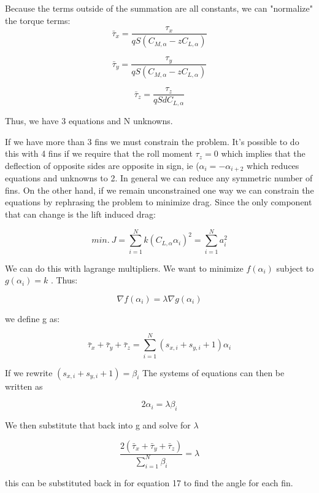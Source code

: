 \documentclass[12pt]{article}
\begin{document}
Because the terms outside of the summation are all constants, we can "normalize" the torque terms:
\begin{equation}
  \bar{\tau}_x = \frac{\tau_x}{ q S (C_{M,\alpha} - z C_{L,\alpha}) }
\end{equation}

\begin{equation}
  \bar{\tau}_y = \frac{\tau_y}{ q S (C_{M,\alpha} - z C_{L,\alpha}) }
\end{equation}

\begin{equation}
  \bar{\tau}_z = \frac{\tau_z}{ q S d C_{L,\alpha} }
\end{equation}

Thus, we have 3 equations and N unknowns.

If we have more than 3 fins we must constrain the problem. It's possible to do this with 4 fins if we require that the roll moment $\tau_z = 0$ which implies that the deflection of opposite sides are opposite in sign, ie ($\alpha_i = -\alpha_{i+2}$ which reduces equations and unknowns to 2. In general we can reduce any symmetric number of fins. On the other hand, if we remain unconstrained one way we can constrain the equations by rephrasing the problem to minimize drag. Since the only component that can change is the lift induced drag:

\begin{equation}
  min.\: J = \sum_{i = 1}^{N} k (C_{L,\alpha} \alpha_i)^2 = \sum_{i = 1}^{N} a_i^2 
\end{equation}

We can do this with lagrange multipliers. We want to minimize $f(\alpha_i)$ subject to $g(\alpha_i) = k$ . Thus:

\begin{equation}
  \nabla f(\alpha_i) = \lambda \nabla g(\alpha_i)
\end{equation}

we define g as:

\begin{equation}
  \bar{\tau}_x + \bar{\tau}_y + \bar{\tau}_z= \sum_{i = 1}^{N} (s_{x,i} + s_{y,i} + 1)\alpha_i
\end{equation}

If we rewrite $(s_{x,i} + s_{y,i} + 1) = \beta_i$ The systems of equations can then be written as

\begin{equation}
  2 \alpha_i = \lambda \beta_i
\end{equation}

We then substitute that back into g and solve for $\lambda$

\begin{equation}
  \frac{ 2(\bar{\tau}_x + \bar{\tau}_y + \bar{\tau}_z ) }{\sum_{i = 1}^{N} \beta_i} = \lambda
\end{equation}

this can be substituted back in for equation 17 to find the angle for each fin.
\end{document}
